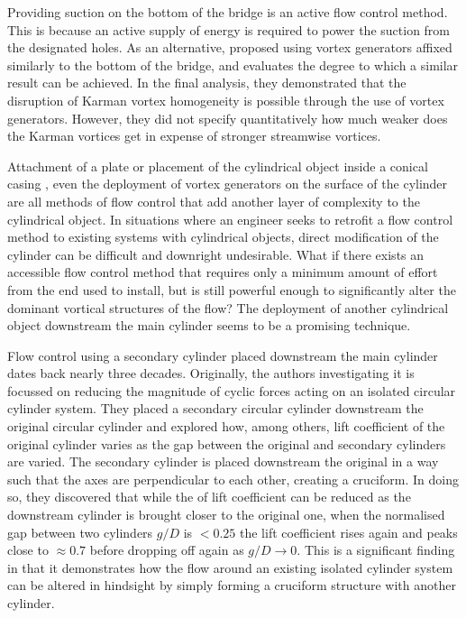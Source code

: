 \documentclass[oneside]{utmthesis}
\begin{document}
Providing suction on the bottom of the bridge is an active flow control method. This is because an active supply of energy is required to power the suction from the designated holes. As an alternative, \citet{Zhang2019} proposed using vortex generators affixed similarly to the bottom of the bridge, and evaluates the degree to which a similar result can be achieved. In the final analysis, they demonstrated that the disruption of Karman vortex homogeneity is possible through the use of vortex generators. However, they did not specify quantitatively how much weaker does the Karman vortices get in expense of stronger streamwise vortices.

Attachment of a plate \citep{Gibeau2019} or placement of the cylindrical object inside a conical casing \citep{Lin2018}, even the deployment of vortex generators on the surface of the cylinder \citep{Zhang2019} are all methods of flow control that add another layer of complexity to the cylindrical object. In situations where an engineer seeks to retrofit a flow control method to existing systems with cylindrical objects, direct modification of the cylinder can be difficult and downright undesirable. What if there exists an accessible flow control method that requires only a minimum amount of effort from the end used to install, but is still powerful enough to significantly alter the dominant vortical structures of the flow? The deployment of another cylindrical object downstream the main cylinder seems to be a promising technique.

Flow control using a secondary cylinder placed downstream the main cylinder dates back nearly three decades. Originally, the authors investigating it \citep{Shirakashi1989} is focussed on reducing the magnitude of cyclic forces acting on an isolated circular cylinder system. They placed a secondary circular cylinder downstream the original circular cylinder and explored how, among others, \rms{} lift coefficient of the original cylinder varies as the gap between the original and secondary cylinders are varied. The secondary cylinder is placed downstream the original in a way such that the axes are perpendicular to each other, creating a cruciform. In doing so, they discovered that while the \rms{} of lift coefficient can be reduced as the downstream cylinder is brought closer to the original one, when the normalised gap between two cylinders $g/D$ is $< 0.25$ the lift coefficient rises again and peaks close to $\approx 0.7$ before dropping off again as $g/D \to 0$. This is a significant finding in that it demonstrates how the flow around an existing isolated cylinder system can be altered in hindsight by simply forming a cruciform structure with another cylinder.
\end{document}
